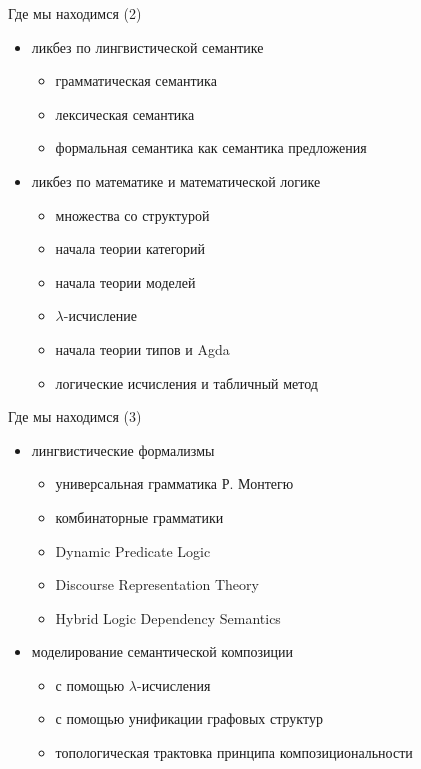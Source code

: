 \documentclass{beamer}
\begin{document}
\begin{frame}{Где мы находимся (2)}
\begin{small}
\begin{itemize}
    \item ликбез по лингвистической семантике
    \begin{itemize}
        \item грамматическая семантика
        \item лексическая семантика
        \item формальная семантика как семантика предложения
    \end{itemize}
    \item ликбез по математике и математической логике
    \begin{itemize}
        \item множества со структурой
        \item начала теории категорий
        \item начала теории моделей
        \item $\lambda$-исчисление
        \item начала теории типов и Agda
        \item логические исчисления и табличный метод
    \end{itemize}
\end{itemize}
\end{small}
\end{frame}

\begin{frame}{Где мы находимся (3)}
\begin{small}
\begin{itemize}
    \item лингвистические формализмы
    \begin{itemize}
        \item универсальная грамматика Р. Монтегю
        \item комбинаторные грамматики
        \item Dynamic Predicate Logic 
        \item Discourse Representation Theory
        \item Hybrid Logic Dependency Semantics
    \end{itemize}
    \item моделирование семантической композиции
    \begin{itemize}
        \item с помощью $\lambda$-исчисления
        \item с помощью унификации графовых структур
        \item топологическая трактовка принципа композициональности
    \end{itemize}
\end{itemize}
\end{small}
\end{frame}
\end{document}
